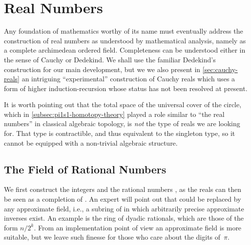 \newcommand{\rclim}{\mathsf{lim}} %
\newcommand{\rcrat}{\mathsf{rat}} %
\newcommand{\rceq}{\mathsf{eq}_{\RC}} %
\newcommand{\CAP}{\mathcal{C}}    %
\newcommand{\Qp}{\Q_{+}}

\newcommand{\dcut}{\mathsf{cut}}  %


\chapter{Real Numbers}
\label{cha:real-numbers}

Any foundation of mathematics worthy of its name must eventually address the construction
of real numbers as understood by mathematical analysis, namely as a complete archimedean
ordered field. Completeness can be understood either in the sense of Cauchy or Dedekind.
We shall use the familiar Dedekind's construction for our main development, but we we also
present in \autoref{sec:cauchy-reals} an intriguing ``experimental'' construction of
Cauchy reals which uses a form of higher induction-recursion whose status has not been
resolved at present.

It is worth pointing out that the total space of the universal cover of the circle, which
in \autoref{subsec:pi1s1-homotopy-theory} played a role similar to ``the real numbers'' in
classical algebraic topology, is \emph{not} the type of reals we are looking for. That
type is contractible, and thus equivalent to the singleton type, so it cannot be equipped
with a non-trivial algebraic structure.


\section{The Field of Rational Numbers}
\label{sec:field-rati-numb}

We first construct the integers \Z and the rational numbers \Q, as the reals can then be
seen as a completion of \Q. An expert will point out that \Q could be replaced by any
approximate field, i.e., a subring of \Q in which arbitrarily precise approximate inverses
exist. An example is the ring of dyadic rationals, which are those of the form $n/2^k$.
From an implementation point of view an approximate field is more suitable, but we leave
such finesse for those who care about the digits of~$\pi$.

